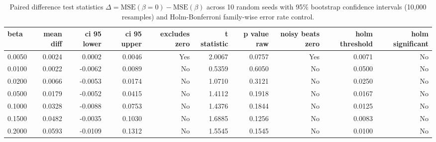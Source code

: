 \begin{table}[htbp]
\centering
\caption{Paired difference test statistics $\Delta = \text{MSE}(\beta=0) - \text{MSE}(\beta)$ across 10 random seeds with 95\% bootstrap confidence intervals (10,000 resamples) and Holm-Bonferroni family-wise error rate control.}
\label{tab:main_sweep_hypothesis}
\begin{tabular}{lrrrrrrrrr}
\toprule
\textbf{beta} & \textbf{mean diff} & \textbf{ci 95 lower} & \textbf{ci 95 upper} & \textbf{excludes zero} & \textbf{t statistic} & \textbf{p value raw} & \textbf{noisy beats zero} & \textbf{holm threshold} & \textbf{holm significant} \\
\midrule
0.0050 & 0.0024 & 0.0002 & 0.0046 & Yes & 2.0067 & 0.0757 & Yes & 0.0071 & No \\
0.0100 & 0.0022 & -0.0062 & 0.0089 & No & 0.5359 & 0.6050 & No & 0.0500 & No \\
0.0200 & 0.0066 & -0.0053 & 0.0174 & No & 1.0710 & 0.3121 & No & 0.0250 & No \\
0.0500 & 0.0179 & -0.0052 & 0.0415 & No & 1.4112 & 0.1918 & No & 0.0167 & No \\
0.1000 & 0.0328 & -0.0088 & 0.0753 & No & 1.4376 & 0.1844 & No & 0.0125 & No \\
0.1500 & 0.0482 & -0.0035 & 0.1030 & No & 1.6885 & 0.1256 & No & 0.0083 & No \\
0.2000 & 0.0593 & -0.0109 & 0.1312 & No & 1.5545 & 0.1545 & No & 0.0100 & No \\
\bottomrule
\end{tabular}
\end{table}